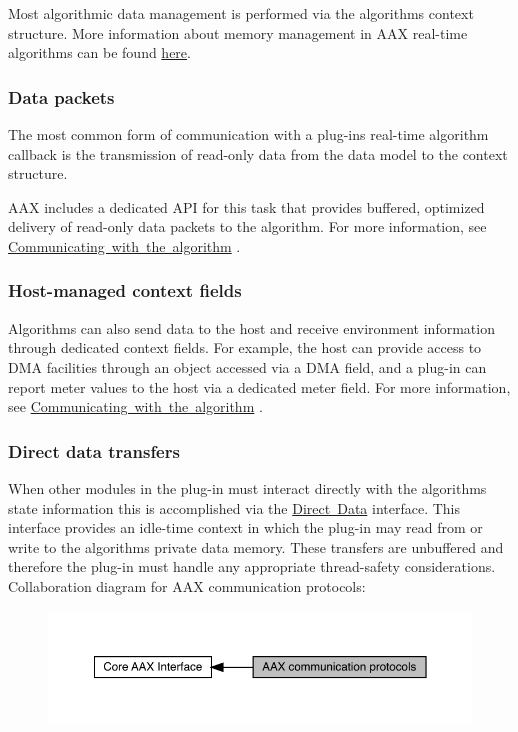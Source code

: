 Most algorithmic data management is performed via the algorithm\textquotesingle{}s context structure. More information about memory management in A\+AX real-\/time algorithms can be found \mbox{\hyperlink{a00797_alg_memmgmt}{here}}.\hypertarget{a00800_CommonInterface_Communication_algorithm_datapackets}{}\subsubsection{Data packets}\label{a00800_CommonInterface_Communication_algorithm_datapackets}
The most common form of communication with a plug-\/in\textquotesingle{}s real-\/time algorithm callback is the transmission of read-\/only data from the data model to the context structure.

A\+AX includes a dedicated A\+PI for this task that provides buffered, optimized delivery of read-\/only data packets to the algorithm. For more information, see \mbox{\hyperlink{a00797_alg_comm}{Communicating with the algorithm}} .\hypertarget{a00800_CommonInterface_Communication_algorithm_fields}{}\subsubsection{Host-\/managed context fields}\label{a00800_CommonInterface_Communication_algorithm_fields}
Algorithms can also send data to the host and receive environment information through dedicated context fields. For example, the host can provide access to D\+MA facilities through an object accessed via a D\+MA field, and a plug-\/in can report meter values to the host via a dedicated meter field. For more information, see \mbox{\hyperlink{a00797_alg_comm}{Communicating with the algorithm}} .\hypertarget{a00800_CommonInterface_Communication_algorithm_directdata}{}\subsubsection{Direct data transfers}\label{a00800_CommonInterface_Communication_algorithm_directdata}
When other modules in the plug-\/in must interact directly with the algorithm\textquotesingle{}s state information this is accomplished via the \mbox{\hyperlink{a00803}{Direct Data}} interface. This interface provides an idle-\/time context in which the plug-\/in may read from or write to the algorithm\textquotesingle{}s private data memory. These transfers are unbuffered and therefore the plug-\/in must handle any appropriate thread-\/safety considerations. Collaboration diagram for A\+AX communication protocols\+:
\nopagebreak
\begin{figure}[H]
\begin{center}
\leavevmode
\includegraphics[width=350pt]{a00800}
\end{center}
\end{figure}
